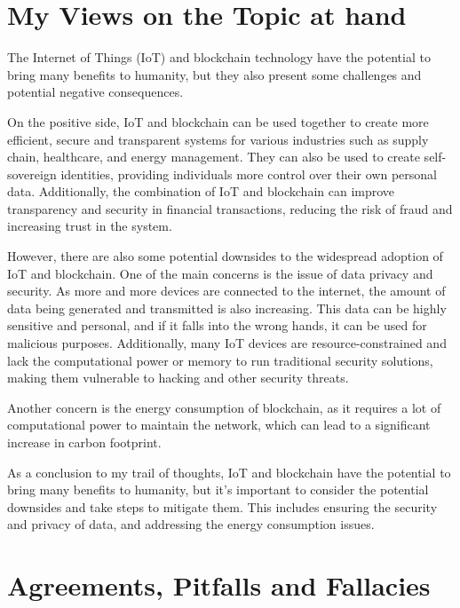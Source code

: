 \documentclass{article}
\begin{document}
\section*{My Views on the Topic at hand}
The Internet of Things (IoT) and blockchain technology have the potential to bring many benefits to humanity, but they also present some challenges and potential negative consequences.

On the positive side, IoT and blockchain can be used together to create more efficient, secure and transparent systems for various industries such as supply chain, healthcare, and energy management. They can also be used to create self-sovereign identities, providing individuals more control over their own personal data. Additionally, the combination of IoT and blockchain can improve transparency and security in financial transactions, reducing the risk of fraud and increasing trust in the system.

However, there are also some potential downsides to the widespread adoption of IoT and blockchain. One of the main concerns is the issue of data privacy and security. As more and more devices are connected to the internet, the amount of data being generated and transmitted is also increasing. This data can be highly sensitive and personal, and if it falls into the wrong hands, it can be used for malicious purposes. Additionally, many IoT devices are resource-constrained and lack the computational power or memory to run traditional security solutions, making them vulnerable to hacking and other security threats.

Another concern is the energy consumption of blockchain, as it requires a lot of computational power to maintain the network, which can lead to a significant increase in carbon footprint.

As a conclusion to my trail of thoughts, IoT and blockchain have the potential to bring many benefits to humanity, but it's important to consider the potential downsides and take steps to mitigate them. This includes ensuring the security and privacy of data, and addressing the energy consumption issues.

\section*{Agreements, Pitfalls and Fallacies}
\end{document}
